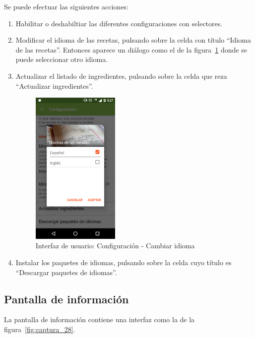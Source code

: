 Se puede efectuar las siguientes acciones:
\begin{enumerate}
\item Habilitar o deshabiltiar las diferentes configuraciones con selectores.
\item Modificar el idioma de las recetas, pulsando sobre la celda con título
  ``Idioma de las recetas''. Entonces aparece un diálogo como el de la
  figura~\ref{fig:captura_27} donde se puede seleccionar otro idioma.
\item Actualizar el listado de ingredientes, pulsando sobre la celda
  que reza ``Actualizar ingredientes''.

  \begin{figure}[htbp]
    \centering
    \includegraphics[width=0.4\textwidth]{cap5/img/captura_27}
    \caption{Interfaz de usuario: Configuración - Cambiar idioma}
    \label{fig:captura_27}
  \end{figure}

\item Instalar los paquetes de idiomas, pulsando sobre la celda cuyo título es
  ``Descargar paquetes de idiomas''.
\end{enumerate}

\subsection{Pantalla de información}

La pantalla de información contiene una interfaz como la de la
figura~\ref{fig:captura_28}.

